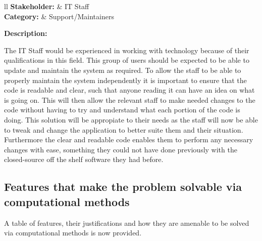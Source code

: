 \noindent
\begin{tblr}{ll}
  \textbf{Stakeholder: } & IT Staff\\
  \textbf{Category: } & Support/Maintainers\\
\end{tblr}
\vspace{0.2cm}

\textbf{Description: } \\ \vspace{0.05cm}

The IT Staff would be experienced in working with technology
because of their qualifications in this field. This group of 
users should be expected to be able to update and maintain the 
system as required. To allow the staff to be able to properly 
maintain the system independently it is important to ensure
that the code is readable and clear, such that anyone reading
it can have an idea on what is going on. This will then allow
the relevant staff to make needed changes to the code without
having to try and understand what each portion of the code is
doing. This solution will be appropiate to their needs as the 
staff will now be able to tweak and change the application to 
better suite them and their situation. Furthermore the clear 
and readable code enables them to perform any necessary changes
with ease, something they could not have done previously with 
the closed-source off the shelf software they had before.

\subsection{Features that make the problem solvable via
computational methods}

A table of features, their justifications and how they are 
amenable to be solved via computational methods is now
provided. 

